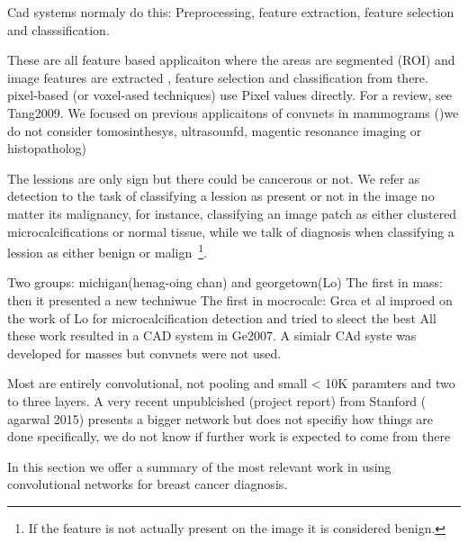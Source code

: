 Cad systems normaly do this: Preprocessing, feature extraction, feature selection and classsification. 

These are all feature based applicaiton where the areas are segmented (ROI) and image features are extracted , feature selection and classification from there.
pixel-based (or voxel-ased techniques) use Pixel values directly. For a review, see Tang2009. We focused on previous applicaitons of convnets in mammograms ()we do not consider tomosinthesys, ultrasounfd, magentic resonance imaging or histopatholog) 

The lessions are only sign but there could be cancerous or not. 
We refer as detection to the task of classifying a lession as present or not in the image no matter its malignancy, for instance, classifying an image patch as either clustered microcalcifications or normal tissue, while we talk of diagnosis when classifying a lession as either benign or malign~\footnote{If the feature is not actually present on the image it is considered benign.}.

Two groups: michigan(henag-oing chan) and georgetown(Lo)
The first in mass:
then it presented a new techniwue
The first in mocrocalc:
Grca et al improed on the work of Lo for microcalcification detection and tried to sleect the best 
All these work resulted in a CAD system in Ge2007. A simialr CAd syste was developed for masses but convnets were not used.

Most are entirely convolutional, not pooling and small < 10K paramters and two to three layers. A very recent unpublcished (project report) from Stanford ( agarwal 2015) presents a bigger network but does not specifiy how things are done specifically, we do not know if further work is expected to come from there

In this section we offer a summary of the most relevant work in using convolutional networks for breast cancer diagnosis. %

\begin{comment}
Separated in blocks:
	1. Initial mass: Sahiran 1996
	2. Multipath circular neural net for mass: Lo 1998-Kinnard 2002 (maybe not)
	3. Intial microcalc detection: Lo 1995- Lo 1998
	4. Optimization of architecture for microcalc: Gurcan 2000-Gurcan 2002
	5. CAD for microcalcification in FFDM. Ge 2007 (CAD for masses didn't use Convnets, used LDA and rule-based classifiers).
	6. Unpublished Stanford convnet: Agarwal 2015
\end{comment}

